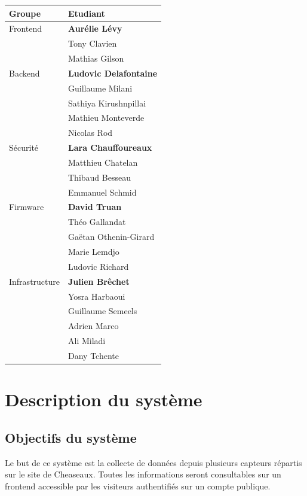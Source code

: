 \documentclass[12pt]{article}
\begin{document}
\renewcommand{\arraystretch}{1.1}
\begin{center}
\begin{tabular}{|l|l|}
	\hline
	Groupe & Etudiant \\
	\hline
	Frontend & \textbf{Aurélie Lévy}  \\
	& Tony Clavien\\
	& Mathias Gilson\\
	\hline
	Backend & \textbf{Ludovic Delafontaine}   \\
	& Guillaume Milani\\
	& Sathiya Kirushnpillai\\
	& Mathieu Monteverde\\
	& Nicolas Rod\\
	\hline
	Sécurité & \textbf{Lara Chauffoureaux}  \\
	& Matthieu Chatelan  \\
	& Thibaud Besseau  \\
	& Emmanuel Schmid  \\
	\hline
	Firmware & \textbf{David Truan} \\
	& Théo Gallandat\\
	& Gaëtan Othenin-Girard\\
	& Marie Lemdjo\\
	& Ludovic Richard\\
	\hline
	Infrastructure & \textbf{Julien Brêchet} \\
	& Yosra Harbaoui\\
	& Guillaume Semeels\\
	& Adrien Marco\\
	& Ali Miladi\\
	& Dany Tchente\\
	\hline
\end{tabular}
\end{center}
\renewcommand{\arraystretch}{1}

\newpage
\section{Description du système}

\subsection{Objectifs du système}\label{objectifssysteme}%

Le but de ce système est la collecte de données depuis plusieurs capteurs répartis sur le site de Cheaseaux. Toutes les informations seront consultables sur un frontend accessible par les visiteurs authentifiés sur un compte publique.
\end{document}
